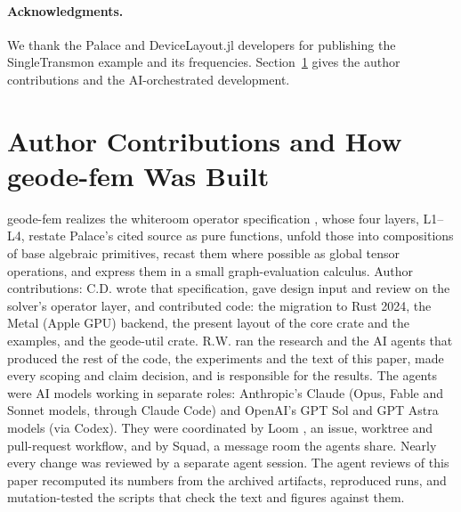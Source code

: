 \documentclass{anvil-paper}
\begin{document}
\paragraph{Acknowledgments.}
We thank the Palace and DeviceLayout.jl developers for publishing the
SingleTransmon example and its frequencies. Section~\ref{sec:built} gives
the author contributions and the AI-orchestrated development.

\section{Author Contributions and How geode-fem Was Built}
\label{sec:built}

geode-fem realizes the whiteroom operator specification
\citep{dunnavant2026whiteroom}, whose four layers, L1--L4,
restate Palace's cited source as pure functions, unfold those into
compositions of base algebraic primitives, recast them where possible as
global tensor operations, and express them in a small graph-evaluation
calculus. Author contributions: C.D. wrote that specification, gave design input and review on the solver's operator layer, and contributed code: the
migration to Rust 2024, the Metal (Apple GPU) backend, the present layout
of the core crate and the examples, and the geode-util crate. R.W. ran
the research and the AI agents that produced the rest of the code, the
experiments and the text of this paper, made every scoping and claim
decision, and is responsible for the results. The agents were AI models
working in separate roles: Anthropic's Claude (Opus, Fable and Sonnet
models, through Claude Code) and OpenAI's GPT Sol and GPT Astra models
(via Codex). They were coordinated by Loom \citep{loom}, an
issue, worktree and pull-request workflow, and by Squad, a message room
the agents share.
Nearly every change was reviewed by a separate agent session. The agent
reviews of this paper recomputed its numbers from the archived artifacts,
reproduced runs, and mutation-tested the scripts that check the text and
figures against them.



\end{document}

